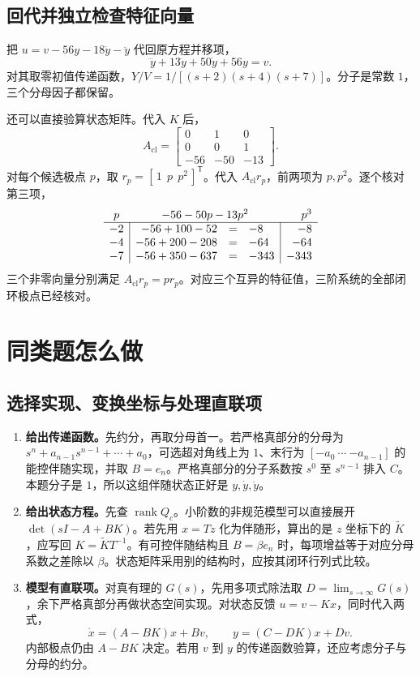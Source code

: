 \subsection{回代并独立检查特征向量}

把 $u=v-56y-18\dot y-\ddot y$ 代回原方程并移项，
\[
   \dddot y+13\ddot y+50\dot y+56y=v .
\]
对其取零初值传递函数，$Y/V=1/[(s+2)(s+4)(s+7)]$。分子是常数 $1$，三个分母因子都保留。

还可以直接验算状态矩阵。代入 $K$ 后，
\[
    A_{\mathrm{cl}}
      =\begin{bmatrix}0&1&0\\0&0&1\\-56&-50&-13\end{bmatrix}.
\]
对每个候选极点 $p$，取 $r_p=[\,1\ \ p\ \ p^2\,]^{\mathsf T}$。代入 $A_{\mathrm{cl}}r_p$，前两项为 $p,p^2$。逐个核对第三项，
\[
\begin{array}{c|rcl|r}
    p &\multicolumn{3}{c|}{-56-50p-13p^2}&p^3\\ \hline
    -2& -56+100-52  &=& -8   & -8\\
    -4& -56+200-208 &=& -64  & -64\\
    -7& -56+350-637 &=& -343 & -343
\end{array}
\]
三个非零向量分别满足 $A_{\mathrm{cl}}r_p=pr_p$。对应三个互异的特征值，三阶系统的全部闭环极点已经核对。

\section{同类题怎么做}

\subsection{选择实现、变换坐标与处理直联项}

\begin{enumerate}
    \item \textbf{给出传递函数。}先约分，再取分母首一。若严格真部分的分母为 $s^n+a_{n-1}s^{n-1}+\cdots+a_0$，可选超对角线上为 $1$、末行为 $[-a_0\ \cdots\ {-a_{n-1}}]$ 的能控伴随实现，并取 $B=e_n$。严格真部分的分子系数按 $s^0$ 至 $s^{n-1}$ 排入 $C$。本题分子是 $1$，所以这组伴随状态正好是 $y,\dot y,\ddot y$。
    \item \textbf{给出状态方程。}先查 $\operatorname{rank}Q_c$。小阶数的非规范模型可以直接展开 $\det(sI-A+BK)$。若先用 $x=Tz$ 化为伴随形，算出的是 $z$ 坐标下的 $\widetilde K$，应写回 $K=\widetilde K T^{-1}$。有可控伴随结构且 $B=\beta e_n$ 时，每项增益等于对应分母系数之差除以 $\beta$。状态矩阵采用别的结构时，应按其闭环行列式比较。
    \item \textbf{模型有直联项。}对真有理的 $G(s)$，先用多项式除法取 $D=\lim_{s\to\infty}G(s)$，余下严格真部分再做状态空间实现。对状态反馈 $u=v-Kx$，同时代入两式，
    \[
        \dot x=(A-BK)x+Bv,\qquad y=(C-DK)x+Dv .
    \]
    内部极点仍由 $A-BK$ 决定。若用 $v$ 到 $y$ 的传递函数验算，还应考虑分子与分母的约分。
\end{enumerate}

